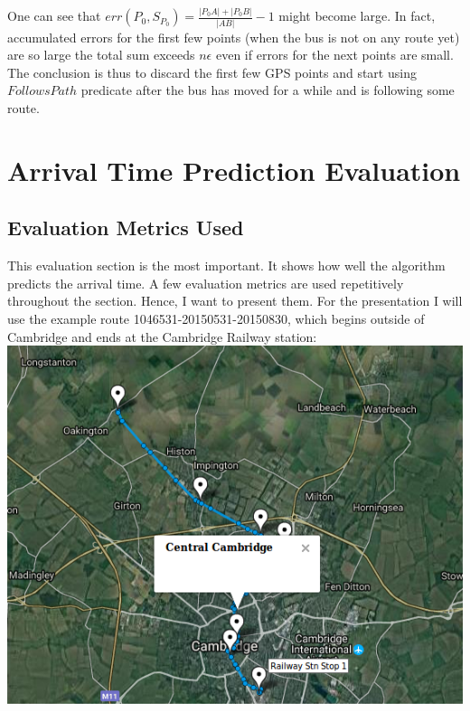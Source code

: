 \documentclass[12pt,a4paper,oneside,openright]{report}
\begin{document}
One can see that $err(P_0, S_{P_0}) = \frac{|{P_0}A| + |{P_0}B|}{|AB|} - 1$
might become large. In fact, accumulated errors for the first few points (when the bus is not on any route yet) are so large the total sum exceeds $n\epsilon$ even if errors for the next points are small. \\

The conclusion is thus to discard the first few GPS points and start using
$FollowsPath$ predicate after the bus has moved for a while and is following 
some route.
\newpage

\section{Arrival Time Prediction Evaluation}

\subsection{Evaluation Metrics Used}

This evaluation section is the most important. It shows how well the algorithm
predicts the arrival time. A few evaluation metrics are used repetitively
throughout the section. Hence, I want to present them. For the presentation I
will use the example route 1046531-20150531-20150830, which begins outside of
Cambridge and ends at the Cambridge Railway station: \\

\includegraphics[width=\textwidth]{figs/cambridge_route.png} \\
\end{document}
